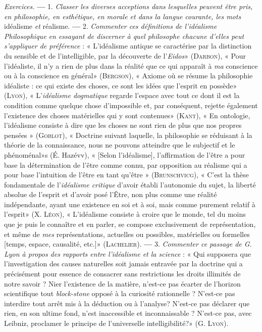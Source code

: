 {\it Exercices.} {\bf —} 1. {\it Classer les diverses acceptions dans lesquelles peuvent
être pris, en philosophie, en esthétique, en morale et dans la langue courante,
les mots} idéalisme {\it et} réalisme. {\bf —} 2. {\it Commenter ces définitions de l’idéalisme
Philosophique en essayant de discerner à quel philosophe chacune d'elles peut
s'appliquer de préférence} : « L’idéalisme antique se caractérise par la distinction
du sensible et de l’intelligible, par la découverte de l’{\it Eidos}» (\textsc{Darbon}),
« Pour l’idéaliste, il n’y a rien de plus dans la réalité que ce qui apparaît à {\it ma}
conscience ou à la conscience en général» (\textsc{Bergson}), « Axiome où se résume
la philosophie idéaliste : ce qui existe des choses, ce sont les idées que
l'esprit en possède» (\textsc{Lyon}), « L'{\it idéalisme dogmatique} regarde l'espace avec
tout ce dont il est la condition comme quelque chose d'impossible et, par
conséquent, rejette également l'existence des choses matérielles qui y
sont contenues» (\textsc{Kant}), « En ontologie, l’idéalisme consiste à dire que les
choses ne sont rien de plus que nos propres pensées » (\textsc{Goblot}), « Doctrine
suivant laquelle, la philosophie se réduisant à la théorie de la connaissance,
nous ne pouvons atteindre que le subjectif et le phénoménal»s (É. Hazévv),
« [Selon l’idéalisme], l'affirmation de l'être a pour base la détermination de
l'être comme connu, par opposition au réalisme qui a pour base l'intuition
de l'être en tant qu'être » (\textsc{Brunschvicg}), « C’est la thèse fondamentale
de l’{\it idéalisme critique} d’avoir établi l'autonomie du sujet, la liberté absolue
de l'esprit et d’avoir posé l’Être, non plus comme une réalité indépendante,
ayant une existence en soi et à soi, mais comme purement relatif à l'esprit»
(X. \textsc{Léon}), « L'idéalisme consiste à croire que le monde, tel du moins que
je puis le connaître et en parler, se compose exclusivement de représentation,
et même de {\it mes} représentations, actuelles ou possibles, matérielles ou
formelles [temps, espace, causalité, etc.]» (\textsc{Lachelier}). {\bf —} 3. {\it Commenter
ce passage de G. Lyon à propos des rapports entre l'idéalisme et la science} :
« Qui supposera que l’investigation des causes naturelles soit jamais entravée
par la doctrine qui a précisément pour essence de consacrer sans restrictions
les droits illimités de notre savoir ? Nier l'existence de la matière,
n'est-ce pas écarter de l’horizon scientifique tout {\it block-stone} opposé à la
curiosité rationnelle ? N'est-ce pas interdire tout arrêt mis à la déduction
ou à l'analyse? N'est-ce pas déclarer que rien, en son ultime fond, n’est
inaccessible et inconnaissable ? N'est-ce pas, avec Leibniz, proclamer le
principe de l’universelle intelligibilité?» (G. \textsc{Lyon}).

